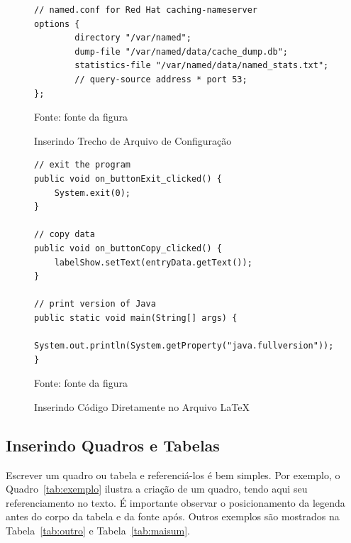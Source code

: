 \begin{figure}[!htb]
\centering
\caption{Inserindo Trecho de Arquivo de Configuração} %
\begin{Verbatim}[fontsize=\small]
// named.conf for Red Hat caching-nameserver
options {
        directory "/var/named";
        dump-file "/var/named/data/cache_dump.db";
        statistics-file "/var/named/data/named_stats.txt";
        // query-source address * port 53;
};
\end{Verbatim} 
{\small Fonte: fonte da figura} %
\label{fig:exemploconfig} %
\end{figure}


\begin{figure}[!htb]
\centering
\caption{Inserindo Código Diretamente no Arquivo \LaTeX} %
\begin{lstlisting}
// exit the program
public void on_buttonExit_clicked() {
	System.exit(0);
}

// copy data
public void on_buttonCopy_clicked() {
	labelShow.setText(entryData.getText());
}

// print version of Java
public static void main(String[] args) {
	System.out.println(System.getProperty("java.fullversion"));
}
\end{lstlisting} 
{\small Fonte: fonte da figura} %
\label{fig:exemplocodigo1} %
\end{figure}


% 

\subsection{Inserindo Quadros e Tabelas}

Escrever um quadro ou tabela e referenciá-los é bem simples. Por exemplo, o Quadro~\ref{tab:exemplo} ilustra a criação de um quadro, tendo aqui seu referenciamento no texto. É importante observar o posicionamento da legenda antes do corpo da tabela e da fonte após. Outros exemplos são mostrados na Tabela~\ref{tab:outro} e Tabela~\ref{tab:maisum}.

